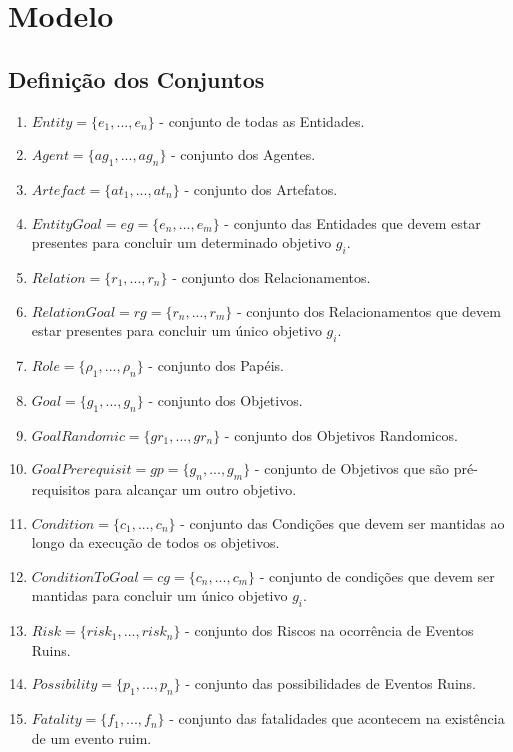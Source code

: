 \documentclass[12pt]{article}
\begin{document}
\section{Modelo}

\subsection{Definição dos Conjuntos}

\begin{enumerate}
	\item $Entity = \{e_1, ..., e_n\}$ - conjunto de todas as Entidades.  
	\item $Agent = \{ag_1, ..., ag_n\}$ - conjunto dos Agentes.
	\item $Artefact = \{at_1, ..., at_n\}$ - conjunto dos Artefatos.
	\item $EntityGoal = eg = \{e_n,...,e_m\}$ - conjunto das Entidades que devem estar presentes para concluir um determinado objetivo $g_i$.
	\item $Relation = \{r_1, ..., r_n\}$ - conjunto dos Relacionamentos.	
	\item $RelationGoal = rg =\{r_n, ..., r_m\}$ - conjunto dos Relacionamentos que devem estar presentes para concluir um único objetivo $g_i$.		
	\item $Role = \{\rho_1, ..., \rho_n\}$ - conjunto dos Papéis.	
	\item $Goal = \{g_1, ..., g_n\}$ - conjunto dos Objetivos.
	\item $GoalRandomic = \{gr_1,..., gr_n\}$ - conjunto dos Objetivos	Randomicos.
	\item $GoalPrerequisit = gp = \{g_n,...,g_m\}$ - conjunto de Objetivos que são pré-requisitos para alcançar um outro objetivo.
	\item $Condition = \{c_1, ..., c_n\}$ - conjunto das Condições que devem ser mantidas ao longo da execução de todos os objetivos.
	\item $ConditionToGoal = cg = \{c_n, ..., c_m\}$ - conjunto de condições que devem ser mantidas para concluir um único objetivo $g_i$.
	\item $Risk = \{risk_1, ..., risk_n\}$ - conjunto dos Riscos na ocorrência de Eventos Ruins.
	\item $Possibility = \{p_1, ..., p_n\}$ - conjunto das possibilidades de Eventos Ruins. 
	\item $Fatality = \{f_1, ..., f_n\}$ - conjunto das fatalidades que acontecem na existência de um evento ruim. 	
\end{enumerate}
\end{document}
